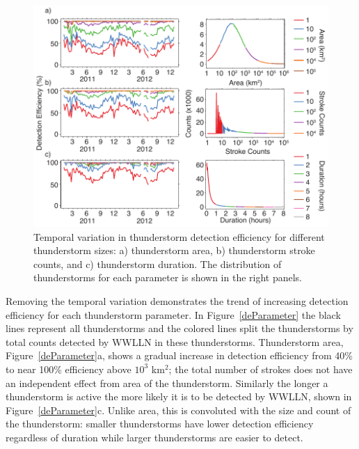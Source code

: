 \begin{figure}[ht!]
   \centering
   \includegraphics[scale=1]{thunderstorm/Figures/deBroken.pdf}
   \caption{Temporal variation in thunderstorm detection efficiency for different thunderstorm sizes: a) thunderstorm area, b) thunderstorm stroke counts, and c) thunderstorm duration.
           The distribution of thunderstorms for each parameter is shown in the right panels.}
   \label{deBroken}
\end{figure}

Removing the temporal variation demonstrates the trend of increasing detection efficiency for each thunderstorm parameter.
In Figure~\ref{deParameter} the black lines represent all thunderstorms and the colored lines split the thunderstorms by total counts detected by WWLLN in these thunderstorms.
Thunderstorm area, Figure~\ref{deParameter}a, shows a gradual increase in detection efficiency from 40\% to near 100\% efficiency above $10^3$ km$^2$; the total number of strokes does not have an independent effect from area of the thunderstorm.
Similarly the longer a thunderstorm is active the more likely it is to be detected by WWLLN, shown in Figure~\ref{deParameter}c.
Unlike area, this is convoluted with the size and count of the thunderstorm: smaller thunderstorms have lower detection efficiency regardless of duration while larger thunderstorms are easier to detect.

